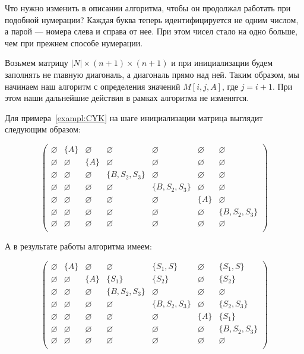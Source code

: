 Что нужно изменить в описании алгоритма, чтобы он продолжал работать при подобной нумерации? Каждая буква теперь идентифицируется не одним числом, а парой --- номера слева и справа от нее. При этом чисел стало на одно больше, чем при прежнем способе нумерации.

Возьмем матрицу  $|N| \times (n + 1) \times (n + 1)$ и при инициализации будем заполнять не главную диагональ, а диагональ прямо над ней. Таким образом, мы начинаем наш алгоритм с определения значений $M[i, j, A] \text{, где } j = i + 1$. При этом наши дальнейшие действия в рамках алгоритма не изменятся.

Для примера~\ref{exampl:CYK} на шаге инициализации матрица выглядит следующим образом:

\[
\begin{pmatrix}
\varnothing & \{A\}       & \varnothing & \varnothing    & \varnothing    & \varnothing & \varnothing    \\
\varnothing & \varnothing & \{A\}     & \varnothing    & \varnothing      & \varnothing & \varnothing    \\
\varnothing & \varnothing & \varnothing & \{B, S_2, S_3\} & \varnothing       & \varnothing & \varnothing    \\
\varnothing & \varnothing & \varnothing & \varnothing    & \{B, S_2, S_3\} & \varnothing & \varnothing   \\
\varnothing & \varnothing & \varnothing & \varnothing    & \varnothing    & \{A\}       & \varnothing    \\
\varnothing & \varnothing & \varnothing & \varnothing    & \varnothing    & \varnothing & \{B, S_2, S_3\} \\
\varnothing & \varnothing & \varnothing & \varnothing    & \varnothing    & \varnothing & \varnothing    \\

\end{pmatrix}
\]

А в результате работы алгоритма имеем:

\[
\begin{pmatrix}
\varnothing & \{A\}       & \varnothing & \varnothing    & \{S_1, S\}     & \varnothing & \{S_1, S\}     \\
\varnothing & \varnothing & \{A\}       & \{S_1\}        & \{S_2\}            & \varnothing & \{S_2\}        \\
\varnothing & \varnothing & \varnothing & \{B, S_2, S_3\} & \varnothing       & \varnothing & \varnothing    \\
\varnothing & \varnothing & \varnothing & \varnothing    & \{B, S_2, S_3\} & \varnothing & \{S_2, S_3\}  \\
\varnothing & \varnothing & \varnothing & \varnothing    & \varnothing    & \{A\}       & \{S_1\}            \\
\varnothing & \varnothing & \varnothing & \varnothing    & \varnothing    & \varnothing & \{B, S_2, S_3\} \\
\varnothing & \varnothing & \varnothing & \varnothing    & \varnothing    & \varnothing & \varnothing    \\
\end{pmatrix}
\]

